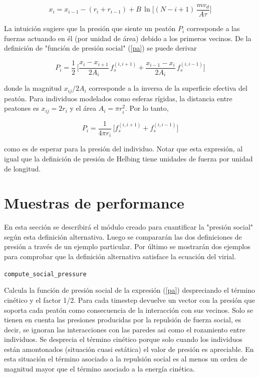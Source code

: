\begin{equation} 
x_i=x_{i-1}-(r_{i}+r_{i-1})+B\,\ln\bigg[(N-i+1)\,\displaystyle\frac{mv_d}{A\tau}
\bigg]\label{eqn_8}
\end{equation}

La intuición sugiere que la presión que siente un peatón $P_i$ 
corresponde a las fuerzas actuando en él (por unidad de área) debido a los primeros vecinos. De la definición de "función de presión social" (\ref{pa}) se puede derivar

\begin{equation}
P_i=\displaystyle\frac{1}{2}\,\bigg[\displaystyle\frac{x_{i}-x_{i+1}}{2A_i}\,
f_s^ { (i , i+1) } +\displaystyle\frac { x_ {i-1}-x_{i}}{2A_i}\,f_s^{(i,i-1) 
}\bigg]\label{eqn_9}
\end{equation}

\vspace{3mm}

donde la magnitud $x_{ij}/2A_i$ corresponde a la inversa de la superficie efectiva del peatón. Para individuos modelados como esferas rígidas, la distancia entre peatones es $x_{ij}=2r_i$ y el área $A_i=\pi r_i^2$. Por lo tanto, 

\begin{equation}
P_i=\displaystyle\frac{1}{4\pi 
r_i}\,\bigg[f_s^ { (i , i+1) } +f_s^{(i,i-1)}\bigg]\label{eqn_10}
\end{equation}

como es de esperar para la presión del individuo. Notar que esta expresión, al igual que la definición de presión de Helbing tiene unidades de fuerza por unidad de longitud. \\


\section{\label{Muestras de performace} Muestras de performance} 

En esta sección se describirá el módulo creado para cuantificar la "presión social" según esta definición alternativa. Luego se compararán las dos definiciones de presión a través de un ejemplo particular. Por último se mostrarán dos ejemplos para comprobar que la definición alternativa satisface la ecuación del virial. 

{\Large {\tt compute\_social\_pressure}}

Calcula la función de presión social de la expresión (\ref{pa}) despreciando el término cinético y el factor 1/2. Para cada timestep devuelve un vector con la presión que soporta cada peatón como consecuencia de la interacción con sus vecinos. Solo se tienen en cuenta las presiones producidas por la repulsión de fuerza social, es decir, se ignoran las interacciones con las paredes asi como el rozamiento entre individuos. Se desprecia el término cinético porque solo cuando los individuos están amontonados (situación cuasi estática) el valor de presión es apreciable. En esta situación el término asociado a la repulsión social es al menos un orden de magnitud mayor que el término asociado a la energía cinética. \\

